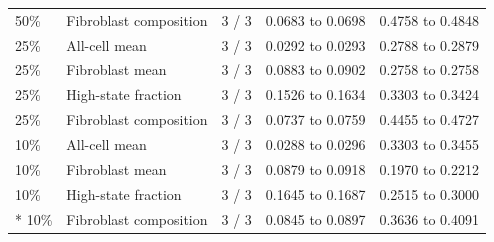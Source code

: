 {\begin{longtable}{@{}p{25mm}p{48mm}p{26mm}p{35mm}p{33mm}@{}}
50\% & Fibroblast composition & 3 / 3 & 0.0683 to 0.0698 & 0.4758 to 0.4848 \\
25\% & All-cell mean & 3 / 3 & 0.0292 to 0.0293 & 0.2788 to 0.2879 \\
25\% & Fibroblast mean & 3 / 3 & 0.0883 to 0.0902 & 0.2758 to 0.2758 \\
25\% & High-state fraction & 3 / 3 & 0.1526 to 0.1634 & 0.3303 to 0.3424 \\
25\% & Fibroblast composition & 3 / 3 & 0.0737 to 0.0759 & 0.4455 to 0.4727 \\
10\% & All-cell mean & 3 / 3 & 0.0288 to 0.0296 & 0.3303 to 0.3455 \\
10\% & Fibroblast mean & 3 / 3 & 0.0879 to 0.0918 & 0.1970 to 0.2212 \\
10\% & High-state fraction & 3 / 3 & 0.1645 to 0.1687 & 0.2515 to 0.3000 \\*
10\% & Fibroblast composition & 3 / 3 & 0.0845 to 0.0897 & 0.3636 to 0.4091 \\
\end{longtable}
}

